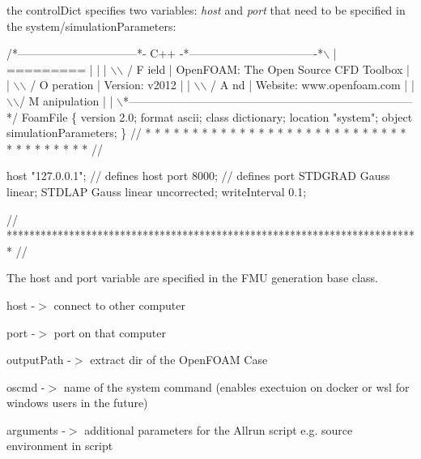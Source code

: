 the control\+Dict specifies two variables\+: {\itshape host} and {\itshape port} that need to be specified in the system/simulation\+Parameters\+:


\begin{DoxyCode}
\textcolor{comment}{/*--------------------------------*- C++ -*----------------------------------*\(\backslash\)}
\textcolor{comment}{| =========                 |                                                 |}
\textcolor{comment}{| \(\backslash\)\(\backslash\)      /  F ield         | OpenFOAM: The Open Source CFD Toolbox           |}
\textcolor{comment}{|  \(\backslash\)\(\backslash\)    /   O peration     | Version:  v2012                                 |}
\textcolor{comment}{|   \(\backslash\)\(\backslash\)  /    A nd           | Website:  www.openfoam.com                      |}
\textcolor{comment}{|    \(\backslash\)\(\backslash\)/     M anipulation  |                                                 |}
\textcolor{comment}{\(\backslash\)*---------------------------------------------------------------------------*/}
FoamFile
\{
    version     2.0;
    format      ascii;
    \textcolor{keyword}{class       }dictionary;
    location    \textcolor{stringliteral}{"system"};
    \textcolor{keywordtype}{object}      simulationParameters;
\}
\textcolor{comment}{// * * * * * * * * * * * * * * * * * * * * * * * * * * * * * * * * * * * * * //}

host            \textcolor{stringliteral}{"127.0.0.1"}; \textcolor{comment}{// defines host }
port            8000; \textcolor{comment}{// defines port}
STDGRAD         Gauss linear;
STDLAP          Gauss linear uncorrected;
writeInterval   0.1;


\textcolor{comment}{// ************************************************************************* //}
\end{DoxyCode}
 The host and port variable are specified in the F\+MU generation base class.


\begin{DoxyItemize}
\item host -\/$>$ connect to other computer
\item port -\/$>$ port on that computer
\item output\+Path -\/$>$ extract dir of the Open\+F\+O\+AM Case
\item oscmd -\/$>$ name of the system command (enables exectuion on docker or wsl for windows users in the future)
\item arguments -\/$>$ additional parameters for the Allrun script e.\+g. source environment in script
\end{DoxyItemize}

